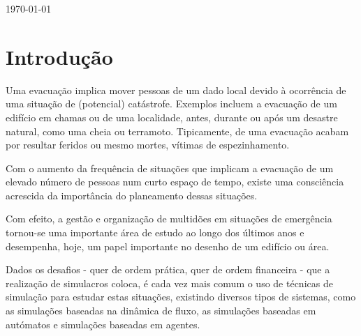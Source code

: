 \documentclass[12pt]{article}
\begin{document}
\begin{titlepage}

{\large \today}\\[0cm] %


\clearpage 

\tableofcontents

\clearpage 
\justify\normalsize

\section{Introdução} 

Uma evacuação implica mover pessoas de um dado local devido à ocorrência de uma situação de (potencial) catástrofe. Exemplos incluem a evacuação de um edifício em chamas ou de uma localidade, antes, durante ou após um desastre natural, como uma cheia ou terramoto. Tipicamente, de uma evacuação acabam por resultar feridos ou mesmo mortes, vítimas de espezinhamento. 

Com o aumento da frequência de situações que implicam a evacuação de um elevado número de pessoas num curto espaço de tempo, existe uma consciência acrescida da importância do planeamento dessas situações.

Com efeito, a gestão e organização de multidões em situações de emergência tornou-se uma importante área de estudo ao longo dos últimos anos e desempenha, hoje, um papel importante no desenho de um edifício ou área.

Dados os desafios - quer de ordem prática, quer de ordem financeira - que a realização de simulacros coloca, é cada vez mais comum o uso de técnicas de simulação para estudar estas situações, existindo diversos tipos de sistemas, como as simulações baseadas na dinâmica de fluxo, as simulações baseadas em autómatos e simulações baseadas em agentes.




\end{titlepage}
\end{document}
